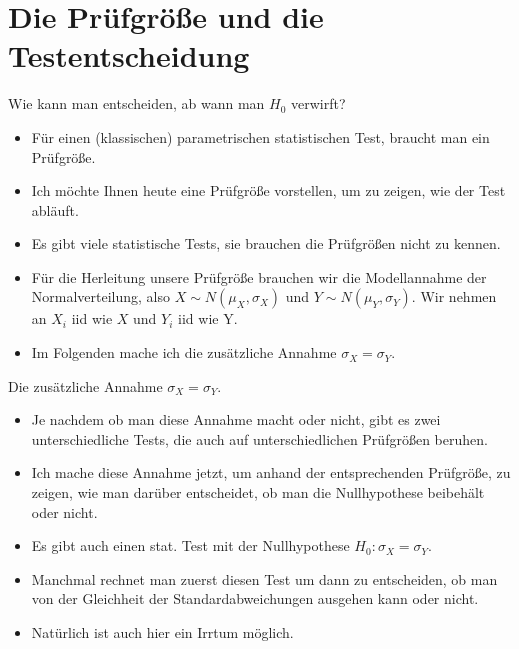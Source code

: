 \documentclass[usenames,dvipsnames,handout]{beamer}
\begin{document}
\section{Die Prüfgröße und die Testentscheidung}

\begin{frame}{Wie kann man entscheiden, ab wann man $H_{0}$ verwirft?}
\begin{itemize}
\item{Für einen (klassischen) parametrischen statistischen Test, braucht man ein Prüfgröße.}\pause
\item{Ich möchte Ihnen heute eine Prüfgröße vorstellen, um zu zeigen, wie der Test abläuft.}\pause
\item{Es gibt viele statistische Tests, sie brauchen die Prüfgrößen nicht zu kennen. }\pause
\item{Für die Herleitung unsere Prüfgröße brauchen wir die Modellannahme der Normalverteilung,
also $X \sim N(\mu_{X},\sigma_{X})$ und $Y \sim N(\mu_{Y},\sigma_{Y}).$ 
Wir nehmen an $X_{i}$ iid wie $X$ und $Y_{i}$ iid wie Y.}\pause
\item{Im Folgenden mache ich die zusätzliche Annahme $\sigma_{X}=\sigma_{Y}.$}
\end{itemize}
\end{frame}

\begin{frame}{Die zusätzliche Annahme $\sigma_{X}=\sigma_{Y}.$}
\begin{itemize}
\item{Je nachdem ob man diese Annahme macht oder nicht, gibt es zwei unterschiedliche Tests,
die auch auf unterschiedlichen Prüfgrößen beruhen.}\pause
\item{Ich mache diese Annahme jetzt, um anhand der entsprechenden Prüfgröße, zu zeigen,
wie man darüber entscheidet, ob man die Nullhypothese beibehält oder nicht.}\pause
\item{Es gibt auch einen stat. Test mit der Nullhypothese  $H_{0}: \sigma_{X}=\sigma_{Y}.$ }\pause
\item{Manchmal rechnet man zuerst diesen Test um dann zu entscheiden, ob man von der Gleichheit
der Standardabweichungen ausgehen kann oder nicht. }
\item{Natürlich ist auch hier ein Irrtum möglich.}
\end{itemize}
\end{frame}
\end{document}
